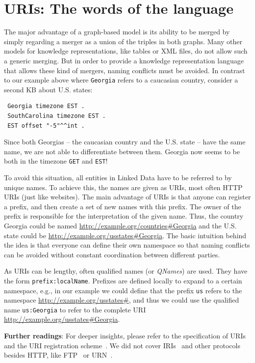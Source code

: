 \section{URIs: The words of the language}
\label{uri}

The major advantage of a graph-based model is its ability to be merged by simply regarding a merger as a union of the triples in both graphs.
Many other models for knowledge representations, like tables or XML files, do not allow such a generic merging.
But in order to provide a knowledge representation language that allows these kind of mergers, naming conflicts must be avoided.
In contrast to our example above where \texttt{Georgia} refers to a caucasian country, consider a second \ac{KB} about U.S. states:

\begin{verbatim}
 Georgia timezone EST .
 SouthCarolina timezone EST .
 EST offset "-5"^^int .
\end{verbatim}

Since both Georgias -- the caucasian country and the U.S. state -- have the same name, we are not able to differentiate between them.
Georgia now seems to be both in the timezone \texttt{GET} and \texttt{EST}!

To avoid this situation, all entities in Linked Data have to be referred to by unique names.
To achieve this, the names are given as URIs, most often HTTP URIs (just like websites).
The main advantage of URIs is that anyone can register a prefix, and then create a set of new names with this prefix.
The owner of the prefix is responsible for the interpretation of the given name.
Thus, the country Georgia could be named \url{http://example.org/countries\#Georgia} and the U.S. state could be \url{http://example.org/usstates\#Georgia}.
The basic intuition behind the idea is that everyone can define their own namespace so that naming conflicts can be avoided without constant coordination between different parties.

As URIs can be lengthy, often qualified names (or \textit{QNames}) are used.
They have the form \texttt{prefix:localName}.
Prefixes are defined locally to expand to a certain namespace, e.g., in our example we could define that the prefix \texttt{us} refers to the namespace \url{http://example.org/usstates\#}, and thus we could use the qualified name \texttt{us:Georgia} to refer to the complete URI \url{http://example.org/usstates\#Georgia}.

\medskip

\textbf{Further readings}:
For deeper insights, please refer to the specification of URIs~\cite{uri} and the URI registration scheme~\cite{uri-registration}.
We did not cover IRIs~\cite{iri} and other protocols besides HTTP, like FTP~\cite{ftp} or URN~\cite{urn}.

